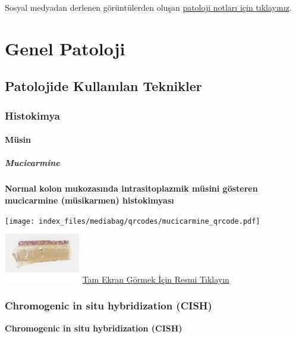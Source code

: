 \documentclass[
  letterpaper,
  DIV=11,
  numbers=noendperiod]{scrreprt}
\begin{document}
Sosyal medyadan derlenen görüntülerden oluşan
\href{https://www.patolojinotlari.com/}{patoloji notları için
tıklayınız}.

\part{Genel Patoloji}

\chapter{Patolojide Kullanılan
Teknikler}\label{sec-patolojide-kullanilan-teknikler}

\section{Histokimya}\label{sec-histokimya}

\subsection{Müsin}\label{sec-musin}

\subsubsection{Mucicarmine}\label{sec-mucicarmine}

\textbf{Normal kolon mukozasında intrasitoplazmik müsini gösteren
mucicarmine (müsikarmen) histokimyası}

\texttt{[image: index\_files/mediabag/qrcodes/mucicarmine\_qrcode.pdf]}
\href{https://images.patolojiatlasi.com/mucin/mucicarmine.html}{\includegraphics[width=0.25\textwidth,height=\textheight]{./screenshots/thumbnail_mucicarmine.png}}
\href{https://images.patolojiatlasi.com/mucin/mucicarmine.html}{Tam
Ekran Görmek İçin Resmi Tıklayın}

\section{Chromogenic in situ hybridization
(CISH)}\label{sec-chromogenic-in-situ-hybridization-cish}

\textbf{Chromogenic in situ hybridization (CISH)}
\end{document}
